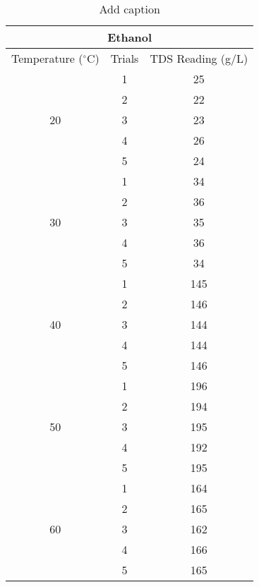 

\begin{table}[H]
  \centering
  \caption{Add caption}
    \begin{tabular}{ccc}
    \toprule
    \multicolumn{3}{c}{Ethanol} \\
    \midrule
    Temperature ($^\circ$C) & Trials & TDS Reading (g/L)  \\
    \midrule
    \multirow{5}[10]{*}{20} & 1     & 25 \\
\cmidrule{2-3}          & 2     & 22 \\
\cmidrule{2-3}          & 3     & 23 \\
\cmidrule{2-3}          & 4     & 26 \\
\cmidrule{2-3}          & 5     & 24 \\
    \midrule
    \multirow{5}[10]{*}{30} & 1     & 34 \\
\cmidrule{2-3}          & 2     & 36 \\
\cmidrule{2-3}          & 3     & 35 \\
\cmidrule{2-3}          & 4     & 36 \\
\cmidrule{2-3}          & 5     & 34 \\
    \midrule
    \multirow{5}[10]{*}{40} & 1     & 145 \\
\cmidrule{2-3}          & 2     & 146 \\
\cmidrule{2-3}          & 3     & 144 \\
\cmidrule{2-3}          & 4     & 144 \\
\cmidrule{2-3}          & 5     & 146 \\
    \midrule
    \multirow{5}[10]{*}{50} & 1     & 196 \\
\cmidrule{2-3}          & 2     & 194 \\
\cmidrule{2-3}          & 3     & 195 \\
\cmidrule{2-3}          & 4     & 192 \\
\cmidrule{2-3}          & 5     & 195 \\
    \midrule
    \multirow{5}[10]{*}{60} & 1     & 164 \\
\cmidrule{2-3}          & 2     & 165 \\
\cmidrule{2-3}          & 3     & 162 \\
\cmidrule{2-3}          & 4     & 166 \\
\cmidrule{2-3}          & 5     & 165 \\
    \bottomrule
    \end{tabular}%
  \label{tab:addlabel}%
\end{table}%

